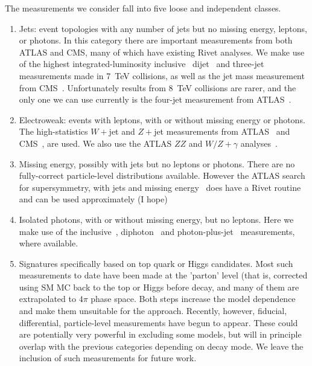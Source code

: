 \documentclass[floatfix]{article}
\begin{document}
The measurements we consider fall into five loose and independent classes.
\begin{enumerate}
\item
Jets: event topologies with any number of jets but no missing energy, leptons, or photons. In this category there
are important measurements from both ATLAS and CMS, many of which have existing Rivet analyses. We make use of 
the highest integrated-luminosity inclusive~\cite{Aad:2014vwa,Chatrchyan:2014gia} dijet~\cite{Aad:2013tea,Aad:2014pua} 
and three-jet~\cite{Aad:2014rma} %
measurements made in 7~TeV collisions, as well as the jet mass 
measurement from CMS~\cite{Chatrchyan:2013vbb}.
Unfortunately results from 8~TeV collisions are rarer, and the only one we can use currently is the four-jet 
measurement from ATLAS~\cite{Aad:2015nda}.
\item
Electroweak: events with leptons, with or without missing energy or photons. The high-statistics $W+$jet and $Z+$jet measurements from ATLAS~\cite{Aad:2014qxa,Aad:2013ysa} 
and CMS~\cite{Khachatryan:2014uva}, are used.
We also use the ATLAS $ZZ$ and $W/Z+\gamma$ analyses~\cite{Aad:2012awa,Aad:2013izg}.
\item
Missing energy, possibly with jets but no leptons or photons. There are no fully-correct particle-level distributions available. 
However the ATLAS search for supersymmetry, with jets and missing energy~\cite{Aad:2012fqa} does have a Rivet routine and can be used approximately (I hope)
\item
Isolated photons, with or without missing energy, but no leptons. Here we make use of the inclusive~\cite{Aad:2013zba}, diphoton~\cite{Aad:2012tba} and 
photon-plus-jet~\cite{ATLAS:2012ar} measurements, where available.
\item
Signatures specifically based on top quark or Higgs candidates. Most such measurements to date have been made at the 'parton' level (that is,
corrected using SM MC back to the top or Higgs before decay, and many of them are extrapolated to $4\pi$ phase space. Both steps increase
the model dependence and make them unsuitable for the \Contur approach. Recently, however, fiducial, differential, particle-level measurements
have begun to appear\cite{}. These could are potentially very powerful in excluding some models, but will in principle overlap with the previous 
categories depending on decay mode. We leave the inclusion of such measurements for future work.
\end{enumerate}
\end{document}
